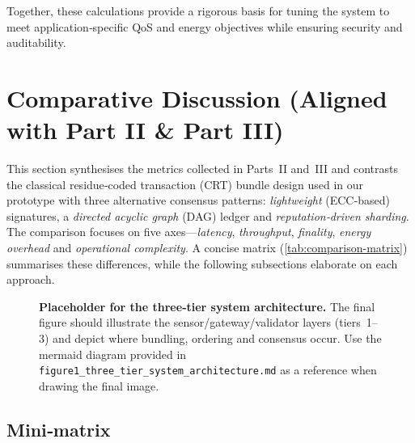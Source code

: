 \documentclass[12pt,onecolumn]{IEEEtran} %
\begin{document}
Together, these calculations provide a rigorous basis for tuning the system to meet
application‑specific QoS and energy objectives while ensuring security and auditability.
\section{Comparative Discussion (Aligned with Part II \& Part III)}
\label{sec:comparative-discussion}

This section synthesises the metrics collected in Parts~II and~III and contrasts the classical residue‑coded transaction (CRT) bundle design used in our prototype with three alternative consensus patterns: \emph{lightweight} (ECC‑based) signatures, a \emph{directed acyclic graph} (DAG) ledger and \emph{reputation‑driven sharding}.  The comparison focuses on five axes—\emph{latency}, \emph{throughput}, \emph{finality}, \emph{energy overhead} and \emph{operational complexity}.  A concise matrix (\autoref{tab:comparison-matrix}) summarises these differences, while the following subsections elaborate on each approach.

\begin{figure}[h]
  \centering
  \caption{\textbf{Placeholder for the three‑tier system architecture.}  The final figure should illustrate the sensor/gateway/validator layers (tiers~1–3) and depict where bundling, ordering and consensus occur.  Use the mermaid diagram provided in \texttt{figure1\_three\_tier\_system\_architecture.md} as a reference when drawing the final image.}
  \label{fig:three-tier-architecture}
\end{figure}

\subsection{Mini‑matrix}
\label{subsec:comparison-matrix}
\end{document}

